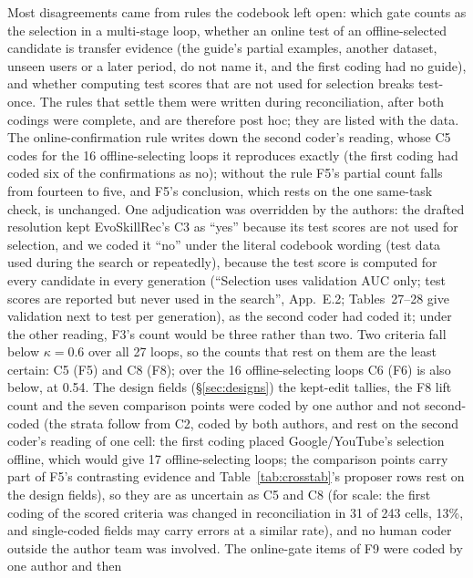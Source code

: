\documentclass[sigconf,nonacm]{acmart}
\begin{document}


 Most disagreements came from rules the codebook left open: which gate counts as the selection
in a multi-stage loop, whether an online test of an offline-selected candidate is transfer evidence (the guide's partial examples, another dataset, unseen users or a later period, do not name it, and the first coding had no guide), and whether
computing test scores that are not used for selection breaks test-once. The rules that settle them were written
during reconciliation, after both codings were complete, and are therefore post hoc; they are listed with the data. The online-confirmation rule writes down the second coder's reading, whose C5 codes for the 16 offline-selecting loops it reproduces exactly (the first coding had coded six of the confirmations as no); without the rule F5's partial count falls from fourteen to five, and F5's conclusion, which rests on the one same-task check, is unchanged.
One adjudication was overridden by the authors: the drafted resolution kept EvoSkillRec's C3 as ``yes'' because its
test scores are not used for selection, and we coded it ``no'' under the literal codebook wording (test data used
during the search or repeatedly), because the test score is computed for every candidate in every generation (``Selection uses validation AUC only; test scores are reported but never used in the search'', App.~E.2; Tables~27--28 give validation next to test per generation), as the second coder had coded it; under the other reading, F3's count would be three rather than two. Two criteria fall
below $\kappa = 0.6$ over all 27 loops, so the counts that rest on them are the least certain: C5 (F5) and C8 (F8); over the 16 offline-selecting loops C6 (F6) is also below, at 0.54. The design fields
(\S\ref{sec:designs}) the kept-edit tallies, the F8 lift count and the seven comparison points were coded by one author and not second-coded (the strata follow from C2, coded by both authors, and rest on the second coder's reading of one cell: the first coding placed Google/YouTube's selection offline, which would give 17 offline-selecting loops; the comparison points carry part of F5's contrasting evidence and Table~\ref{tab:crosstab}'s proposer rows rest on the design fields), so they are as uncertain as C5 and C8 (for scale: the first coding of the scored criteria was changed in reconciliation in 31 of 243 cells, 13\%, and single-coded fields may carry errors at a similar rate), and no
human coder outside the author team was involved. The online-gate items of F9 were coded by one author and then
\end{document}
